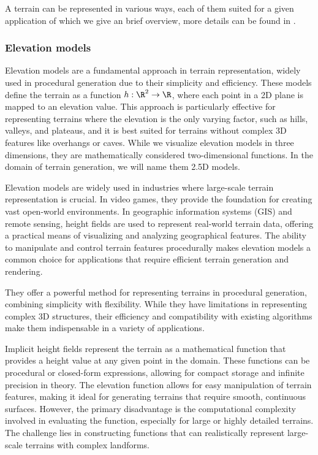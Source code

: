 A terrain can be represented in various ways, each of them suited for a given application of which we give an brief overview, more details can be found in \cite{Galin2019}.

\subsubsection{Elevation models}

Elevation models are a fundamental approach in terrain representation, widely used in procedural generation due to their simplicity and efficiency. These models define the terrain as a function $h : \R^2 \to \R$, where each point in a 2D plane is mapped to an elevation value. This approach is particularly effective for representing terrains where the elevation is the only varying factor, such as hills, valleys, and plateaus, and it is best suited for terrains without complex 3D features like overhangs or caves. While we visualize elevation models in three dimensions, they are mathematically considered two-dimensional functions. In the domain of terrain generation, we will name them 2.5D models.

Elevation models are widely used in industries where large-scale terrain representation is crucial. In video games, they provide the foundation for creating vast open-world environments. In geographic information systems (GIS) and remote sensing, height fields are used to represent real-world terrain data, offering a practical means of visualizing and analyzing geographical features. The ability to manipulate and control terrain features procedurally makes elevation models a common choice for applications that require efficient terrain generation and rendering.

They offer a powerful method for representing terrains in procedural generation, combining simplicity with flexibility. While they have limitations in representing complex 3D structures, their efficiency and compatibility with existing algorithms make them indispensable in a variety of applications.

Implicit height fields represent the terrain as a mathematical function that provides a height value at any given point in the domain. These functions can be procedural or closed-form expressions, allowing for compact storage and infinite precision in theory. The elevation function allows for easy manipulation of terrain features, making it ideal for generating terrains that require smooth, continuous surfaces. However, the primary disadvantage is the computational complexity involved in evaluating the function, especially for large or highly detailed terrains. The challenge lies in constructing functions that can realistically represent large-scale terrains with complex landforms.

